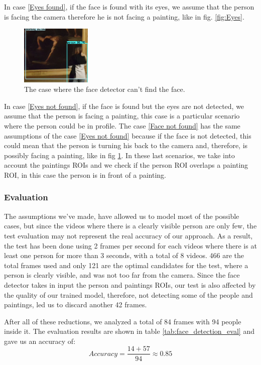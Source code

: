 In case \ref*{Eyes found}, if the face is found with its eyes, we assume that the person is facing the camera therefore he is not facing a painting, like in fig. \ref{fig:Eyes}.
\begin{figure}[h!]
    \centering
    \includegraphics[width=0.3\textwidth]{pictures/face_detection/face_det1}
    \caption{The case where the face detector can't find the face.}
    \label{fig:No_eyes}
\end{figure}
In case \ref*{Eyes not found}, if the face is found but the eyes are not detected, we assume that the person is facing a painting, this case is a particular scenario where the person could be in profile. The case \ref*{Face not found} has the same assumptions of the case \ref*{Eyes not found} because if the face is not detected, this could mean that the person is turning his back to the camera and, therefore, is possibly facing a painting, like in fig \ref{fig:No_eyes}. In these last scenarios, we take into account the paintings ROIs and we check if the person ROI overlaps a painting ROI, in this case the person is in front of a painting.

\subsubsection{Evaluation}
The assumptions we've made, have allowed us to model most of the possible cases, but since the videos where there is a clearly visible person are only few, the test evaluation may not represent the real accuracy of our approach. As a result, the test has been done using 2 frames per second for each videos where there is at least one person for more than 3 seconds, with a total of 8 videos. 466 are the total frames used and only 121 are the optimal candidates for the test, where a person is clearly visible, and was not too far from the camera. Since the face detector takes in input the person and paintings ROIs, our test is also affected by the quality of our trained model, therefore, not detecting some of the people and paintings, led us to discard another 42 frames.

After all of these reductions, we analyzed a total of 84 frames with 94 people inside it. The evaluation results are shown in table \ref{tab:face_detection_eval} and gave us an accuracy of: \[Accuracy = \frac{14+57}{94} \approx 0.85\]

